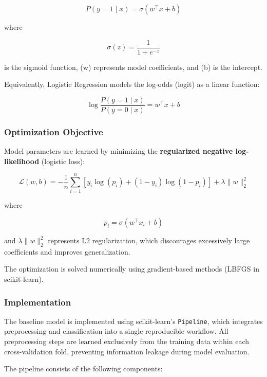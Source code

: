 \documentclass[
  letterpaper,
  DIV=11,
  numbers=noendperiod]{scrartcl}
\begin{document}
\[
P(y = 1 \mid x) = \sigma(w^\top x + b)
\]

where

\[
\sigma(z) = \frac{1}{1 + e^{-z}}
\]

is the sigmoid function, (w) represents model coefficients, and (b) is
the intercept.

Equivalently, Logistic Regression models the log-odds (logit) as a
linear function:

\[
\log \frac{P(y=1 \mid x)}{P(y=0 \mid x)} = w^\top x + b
\]

\subsubsection{Optimization Objective}\label{optimization-objective}

Model parameters are learned by minimizing the \textbf{regularized
negative log-likelihood} (logistic loss):

\[
\mathcal{L}(w,b)
=
-\frac{1}{n}
\sum_{i=1}^{n}
\left[
y_i \log(p_i) + (1-y_i)\log(1-p_i)
\right]
+ \lambda \|w\|_2^2
\]

where

\[
p_i = \sigma(w^\top x_i + b)
\]

and \(\lambda \|w\|_2^2\) represents L2 regularization, which
discourages excessively large coefficients and improves generalization.

The optimization is solved numerically using gradient-based methods
(LBFGS in scikit-learn).

\subsubsection{Implementation}\label{implementation}

The baseline model is implemented using scikit-learn's
\texttt{Pipeline}, which integrates preprocessing and classification
into a single reproducible workflow. All preprocessing steps are learned
exclusively from the training data within each cross-validation fold,
preventing information leakage during model evaluation.

The pipeline consists of the following components:
\end{document}
